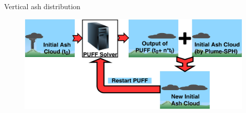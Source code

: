 \documentclass{beamer}
\begin{document}
\begin{frame}{Vertical ash distribution}
\begin{figure}
\center
\includegraphics[width=0.60 \textwidth]{Chapter-7/Figures/Restart-PUFF} 
\end{figure}

\end{frame}
\end{document}
